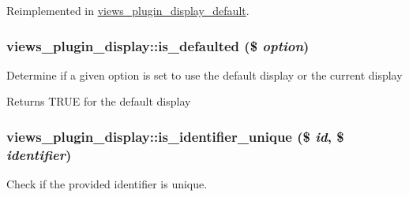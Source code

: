 Reimplemented in \hyperlink{classviews__plugin__display__default_a721b29f71ff0536dfcf28831e4b96e72}{views\_\-plugin\_\-display\_\-default}.\hypertarget{classviews__plugin__display_a8f5676603ce803078ea100a5781bfbd6}{
\subsubsection[{is\_\-defaulted}]{\setlength{\rightskip}{0pt plus 5cm}views\_\-plugin\_\-display::is\_\-defaulted (\$ {\em option})}}
\label{classviews__plugin__display_a8f5676603ce803078ea100a5781bfbd6}
Determine if a given option is set to use the default display or the current display

\begin{DoxyReturn}{Returns}
TRUE for the default display 
\end{DoxyReturn}
\hypertarget{classviews__plugin__display_a089aaa0e268fbbc4aae2db742a7f036d}{
\subsubsection[{is\_\-identifier\_\-unique}]{\setlength{\rightskip}{0pt plus 5cm}views\_\-plugin\_\-display::is\_\-identifier\_\-unique (\$ {\em id}, \/  \$ {\em identifier})}}
\label{classviews__plugin__display_a089aaa0e268fbbc4aae2db742a7f036d}
Check if the provided identifier is unique.


